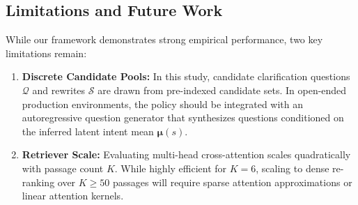 \subsection{Limitations and Future Work}
While our framework demonstrates strong empirical performance, two key limitations remain:
\begin{enumerate}
    \item \textbf{Discrete Candidate Pools:} In this study, candidate clarification questions $\mathcal{Q}$ and rewrites $\mathcal{S}$ are drawn from pre-indexed candidate sets. In open-ended production environments, the policy should be integrated with an autoregressive question generator that synthesizes questions conditioned on the inferred latent intent mean $\bm{\mu}(s)$.
    \item \textbf{Retriever Scale:} Evaluating multi-head cross-attention scales quadratically with passage count $K$. While highly efficient for $K=6$, scaling to dense re-ranking over $K \ge 50$ passages will require sparse attention approximations or linear attention kernels.
\end{enumerate}
